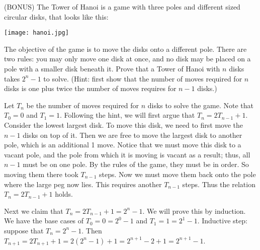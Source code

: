 \documentclass[solution, letterpaper]{cs20inclass}
\begin{document}
\problem (BONUS) The Tower of Hanoi is a game with three poles and different sized circular disks, that looks like this:
\begin{center}
\texttt{[image: hanoi.jpg]}
\end{center}
The objective of the game is to move the disks onto a different pole. There are two rules: you may only move one disk at once, and no disk may be placed on a pole with a smaller disk beneath it. Prove that a Tower of Hanoi with $n$ disks takes $2^n-1$ to solve. (Hint: first show that the number of moves required for $n$ disks is one plus twice the number of moves requires for $n-1$ disks.)
\begin{solution}

Let $T_n$ be the number of moves required for $n$ disks to solve the game. Note that $T_0 = 0$ and $T_1 = 1$. Following the hint, we will first argue that $T_n = 2T_{n-1} + 1$. Consider the lowest largest disk. To move this disk, we need to first move the $n-1$ disks on top of it. Then we are free to move the largest disk to another pole, which is an additional 1 move. Notice that we must move this disk to a vacant pole, and the pole from which it is moving is vacant as a result; thus, all $n-1$ must be on one pole. By the rules of the game, they must be in order. So moving them there took $T_{n-1}$ steps. Now we must move them back onto the pole where the large peg now lies. This requires another $T_{n-1}$ steps. Thus the relation $T_n = 2T_{n-1} + 1$ holds.

Next we claim that $T_n = 2T_{n-1} + 1 = 2^n-1$. We will prove this by induction. We have the base cases of $T_0 = 0 = 2^0-1$ and $T_1 = 1 = 2^1 - 1$. Inductive step: suppose that  $T_n = 2^n-1$. Then $T_{n+1} = 2T_{n+1}+1 = 2(2^n-1)+1 = 2^{n+1} - 2  + 1 = 2^{n+1}-1$.
 
\end{solution}
\end{document}
